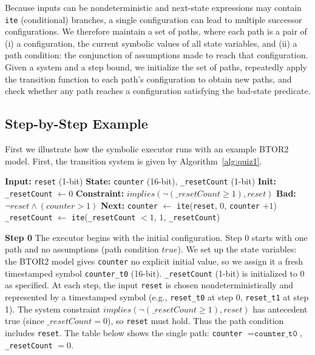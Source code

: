 \documentclass[11pt]{article}
\begin{document}
Because inputs can be nondeterministic and next-state expressions may contain \texttt{ite} (conditional) branches, a single configuration can lead to multiple successor configurations. We therefore maintain a set of paths, where each path is a pair of (i) a configuration, the current symbolic values of all state variables, and (ii) a path condition: the conjunction of assumptions made to reach that configuration. Given a system and a step bound, we initialize the set of paths, repeatedly apply the transition function to each path's configuration to obtain new paths, and check whether any path reaches a configuration satisfying the bad-state predicate.

\subsection{Step-by-Step Example}

First we illustrate how the symbolic executor runs with an example BTOR2 model. First, the transition system is given by Algorithm~\ref{alg:quiz1}.

\begin{algorithm}
    \caption{Quiz1 transition system}
    \label{alg:quiz1}
    \begin{algorithmic}[1]
    \State \textbf{Input:} \texttt{reset} (1-bit)
    \State \textbf{State:} \texttt{counter} (16-bit), \texttt{\_resetCount} (1-bit)
    \State \textbf{Init:} \texttt{\_resetCount} $\gets 0$
    \State \textbf{Constraint:} $\mathit{implies}(\neg(\mathit{\_resetCount} \geq 1), \mathit{reset})$
    \State \textbf{Bad:} $\neg\mathit{reset} \land (\mathit{counter} > 1)$
    \State \textbf{Next:}
    \State \quad \texttt{counter} $\gets$ \texttt{ite}(\texttt{reset}, $0$, \texttt{counter} $+ 1$)
    \State \quad \texttt{\_resetCount} $\gets$ \texttt{ite}(\texttt{\_resetCount} $< 1$, $1$, \texttt{\_resetCount})
    \end{algorithmic}
\end{algorithm}

\textbf{Step 0} The executor begins with the initial configuration. Step 0 starts with one path and no assumptions (path condition $\mathit{true}$). We set up the state variables: the BTOR2 model gives \texttt{counter} no explicit initial value, so we assign it a fresh timestamped symbol \texttt{counter\_t0} (16-bit). \texttt{\_resetCount} (1-bit) is initialized to $0$ as specified. At each step, the input \texttt{reset} is chosen nondeterministically and represented by a timestamped symbol (e.g., \texttt{reset\_t0} at step 0, \texttt{reset\_t1} at step 1). The system constraint $\mathit{implies}(\neg(\mathit{\_resetCount} \geq 1), \mathit{reset})$ has antecedent true (since $\mathit{\_resetCount} = 0$), so \texttt{reset} must hold. Thus the path condition includes \texttt{reset}. The table below shows the single path: \texttt{counter} $= \texttt{counter\_t0}$, \texttt{\_resetCount} $= 0$.
\end{document}
